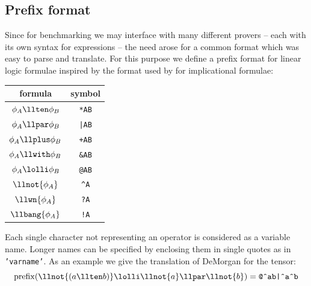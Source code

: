 \subsection{Prefix format}\label{sec:prefix}
Since for benchmarking we may interface with many different provers -- each with its own syntax for expressions -- the need arose for a common format which was easy to parse and translate.
For this purpose we define a prefix format for linear logic formulae inspired by the format used by \cite{TarauPaiva} for implicational formulae:
\begin{table}[H]
	\centering
	\begin{tabular}{cc}
		\hline
			formula & symbol \\
		\hline
		\hline
			$\phi_A \llten \phi_B$  & \texttt{*AB} \\
			$\phi_A \llpar \phi_B$  & \texttt{|AB} \\
			$\phi_A \llplus \phi_B$ & \texttt{+AB} \\
			$\phi_A \llwith \phi_B$ & \texttt{\&AB} \\
			$\phi_A \lolli \phi_B$  & \texttt{@AB} \\
			$\llnot{\phi_A}$        & \texttt{\^{}A} \\
			$\llwn{\phi_A}$         & \texttt{?A} \\
			$\llbang{\phi_A}$       & \texttt{!A} \\
	\end{tabular}
\end{table}
Each single character not representing an operator is considered as a variable name.
Longer names can be specified by enclosing them in single quotes as in \texttt{'varname'}.
As an example we give the translation of DeMorgan for the tensor:
$$ \mathrm{prefix}(\llnot{(a \llten b)} \lolli \llnot{a} \llpar \llnot{b}) = \text{\texttt{@\^{}ab|\^{}a\^{}b}} $$


